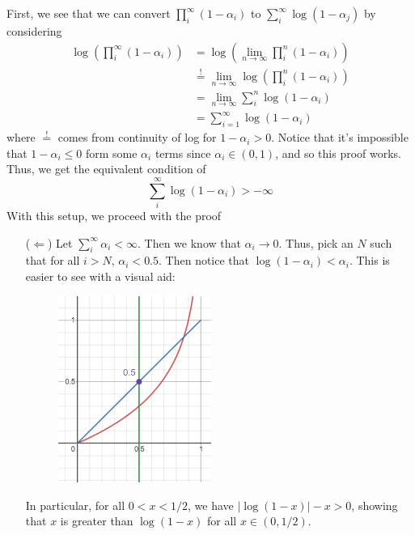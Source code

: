 \documentclass[oneside]{book}
\newcommand{\rw}{\rightarrow}
\newcommand{\Lw}{\Leftarrow}
\begin{document}
\begin{Proof}
		First, we see that we can convert $\prod_i^\infty (1-\alpha_i)$ to $\sum_i^\infty
		\log(1-\alpha_j)$ by considering 
		\begin{align*}
			\log\left(\prod_i^\infty(1-\alpha_i)\right) &= \log\left(\lim_{n \rw \infty}\prod_i^n
			(1-\alpha_i)\right)\\
														&\overset{!}{=} \lim_{n \rw \infty} \log(\prod_i^n
														(1-\alpha_i))\\
														&= \lim_{n \rw \infty} \sum_i^n \log(1-\alpha_i)\\
														&= \sum_{i=1}^\infty \log(1-\alpha_i)
		\end{align*}
		where $\overset{!}{=}$ comes from continuity of log for $1-\alpha_i > 0$. Notice that it's
		impossible that $1-\alpha_i
		\le 0$ form some $\alpha_i$ terms since $\alpha_i \in (0,1)$, and so this proof works. Thus, we get
		the equivalent condition of
		\[
			\sum_i^\infty \log(1-\alpha_i) > -\infty
		\]
		With this setup, we proceed with the proof
		\begin{enumerate}
			\item[($\Lw$)] Let $\sum_i^\infty \alpha_i < \infty$. Then we know that $\alpha_i \rw 0$. Thus,
				pick an $N$ such that for all $i > N$, $\alpha_i < 0.5$. Then notice that $\log(1-\alpha_i)
				< \alpha_i$. This is easier to see with a visual aid:
				\begin{figure}[H]
					\centering
					\includegraphics[width=5cm]{q32VisIntuition}
				\end{figure}
				In particular, for all $0 <x < 1/2$, we have $|\log(1-x)| -x > 0$, showing that $x$ is greater
				than $\log(1-x)$ for all $x \in (0,1/2)$.


\end{enumerate}
\end{Proof}
\end{document}
